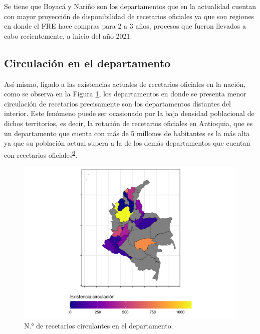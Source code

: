 \documentclass[
]{book}
\begin{document}
Se tiene que Boyacá y Nariño son los departamentos que en la actualidad cuentan con mayor proyección de disponibilidad de recetarios oficiales ya que son regiones en donde el FRE hace compras para 2 a 3 años, procesos que fueron llevados a cabo recientemente, a inicio del año 2021.

\hypertarget{circulaciuxf3n-en-el-departamento}{%
\subsection{Circulación en el departamento}\label{circulaciuxf3n-en-el-departamento}}

Así mismo, ligado a las existencias actuales de recetarios oficiales en la nación, como se observa en la Figura \ref{fig:existenciasRecetarios2}, los departamentos en donde se presenta menor circulación de recetarios precisamente son los departamentos distantes del interior. Este fenómeno puede ser ocasionado por la baja densidad poblacional de dichos territorios, es decir, la rotación de recetarios oficiales en Antioquia, que es un departamento que cuenta con más de 5 millones de habitantes es la más alta ya que su población actual supera a la de los demás departamentos que cuentan con recetarios oficiales\textsuperscript{\protect\hyperlink{ref-DANE2021}{6}}.

\begin{figure}

{\centering \includegraphics[width=0.85\linewidth]{InformeFinal_files/figure-latex/existenciasRecetarios2-1} 

}

\caption{N.° de recetarios circulantes en el departamento.}\label{fig:existenciasRecetarios2}
\end{figure}
\end{document}
